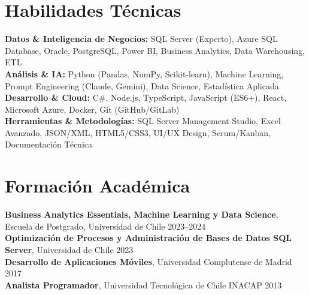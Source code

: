 \documentclass[11pt,letterpaper]{article}
\begin{document}
\section{Habilidades T\'{e}cnicas}
\textbf{Datos \& Inteligencia de Negocios:} SQL Server (Experto), Azure SQL Database, Oracle, PostgreSQL, Power BI, Business Analytics, Data Warehousing, ETL \\
\textbf{Análisis \& IA:} Python (Pandas, NumPy, Scikit-learn), Machine Learning, Prompt Engineering (Claude, Gemini), Data Science, Estadística Aplicada \\
\textbf{Desarrollo \& Cloud:} C\#, Node.js, TypeScript, JavaScript (ES6+), React, Microsoft Azure, Docker, Git (GitHub/GitLab) \\
\textbf{Herramientas \& Metodologías:} SQL Server Management Studio, Excel Avanzado, JSON/XML, HTML5/CSS3, UI/UX Design, Scrum/Kanban, Documentación Técnica

\section{Formaci\'{o}n Acad\'{e}mica}
\textbf{Business Analytics Essentials, Machine Learning y Data Science}, Escuela de Postgrado, Universidad de Chile \hfill 2023–2024 \\
\textbf{Optimización de Procesos y Administración de Bases de Datos SQL Server}, Universidad de Chile \hfill 2023 \\
\textbf{Desarrollo de Aplicaciones Móviles}, Universidad Complutense de Madrid \hfill 2017 \\
\textbf{Analista Programador}, Universidad Tecnológica de Chile INACAP \hfill 2013
\end{document}
